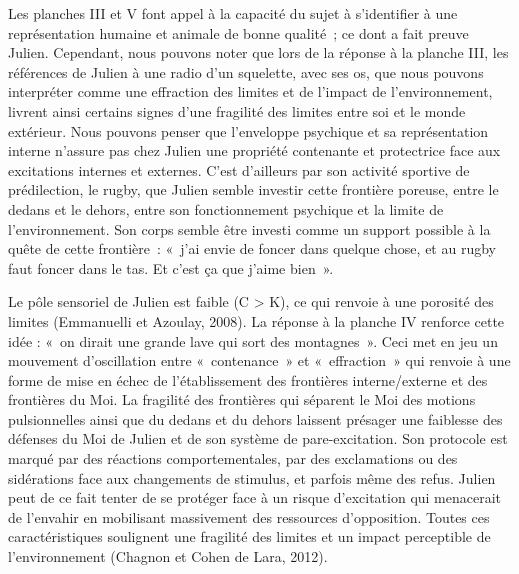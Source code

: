 \documentclass[12pt, a4paper]{book}
\begin{document}
\begin{spacing}{1.5}
Les planches III et V font appel à la capacité du sujet à s'identifier à une représentation humaine et animale de bonne qualité ; ce dont a fait preuve Julien. Cependant, nous pouvons noter que lors de la réponse à la planche III, les références de Julien à une radio d'un squelette, avec ses os, que nous pouvons interpréter comme une effraction des limites et de l'impact de l'environnement, livrent ainsi certains signes d'une fragilité des limites entre soi et le monde extérieur. Nous pouvons penser que l'enveloppe psychique et sa représentation interne n'assure pas chez Julien une propriété contenante et protectrice face aux excitations internes et externes. C'est d'ailleurs par son activité sportive de prédilection, le rugby, que Julien semble investir cette frontière poreuse, entre le dedans et le dehors, entre son fonctionnement psychique et la limite de l'environnement. Son corps semble être investi comme un support possible à la quête de cette frontière : « j'ai envie de foncer dans quelque chose, et au rugby faut foncer dans le tas. Et c'est ça que j'aime bien ». 

Le pôle sensoriel de Julien est faible (C > K), ce qui renvoie à une porosité des limites (Emmanuelli et Azoulay, 2008). La réponse à la planche IV renforce cette idée : « on dirait une grande lave qui sort des montagnes ». Ceci met en jeu un mouvement d'oscillation entre « contenance » et « effraction » qui renvoie à une forme de mise en échec de l'établissement des frontières interne/externe et des frontières du Moi. La fragilité des frontières qui séparent le Moi des motions pulsionnelles ainsi que du dedans et du dehors laissent présager une faiblesse des défenses du Moi de Julien et de son système de pare-excitation. Son protocole est marqué par des réactions comportementales, par des exclamations ou des sidérations face aux changements de stimulus, et parfois même des refus.  Julien   peut de ce fait tenter de se protéger face à un risque d'excitation qui menacerait de l'envahir en mobilisant massivement des ressources d'opposition. Toutes ces caractéristiques soulignent une fragilité des limites et un impact perceptible de l'environnement (Chagnon et Cohen de Lara, 2012).


\end{spacing}
\end{document}

